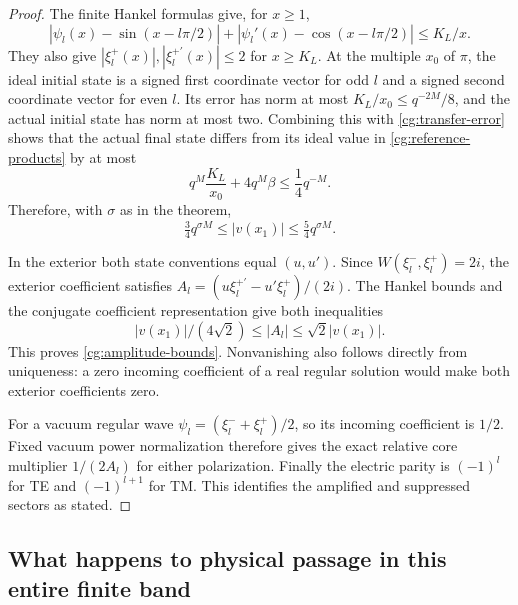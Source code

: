 \begin{proof}
The finite Hankel formulas give, for $x\geq1$,
\begin{equation}\label{cg:bessel-errors}
 |\psi_l(x)-\sin(x-l\pi/2)|
 +|\psi_l'(x)-\cos(x-l\pi/2)|\leq K_L/x.
\end{equation}
They also give $|\xi_l^+(x)|,|\xi_l^{+\prime}(x)|\leq2$
for $x\geq K_L$.  At the multiple $x_0$ of $\pi$, the ideal
initial state is a signed first coordinate vector for odd $l$ and
a signed second coordinate vector for even $l$.  Its error has norm
at most $K_L/x_0\leq q^{-2M}/8$, and the actual initial state
has norm at most two.  Combining this with
\eqref{cg:transfer-error} shows that the actual final state differs
from its ideal value in \eqref{cg:reference-products} by at most
\begin{equation}\label{cg:state-error}
 q^M\frac{K_L}{x_0}+4q^M\beta\leq\frac14q^{-M}.
\end{equation}
Therefore, with $\sigma$ as in the theorem,
\begin{equation}\label{cg:state-size}
 \tfrac34q^{\sigma M}\leq|v(x_1)|
       \leq\tfrac54q^{\sigma M}.
\end{equation}

In the exterior both state conventions equal $(u,u')$.  Since
$W(\xi_l^-,\xi_l^+)=2i$, the exterior coefficient satisfies
$A_l=(u\xi_l^{+\prime}-u'\xi_l^+)/(2i)$.
The Hankel bounds and the conjugate coefficient representation
give both inequalities
\begin{equation}\label{cg:coefficient-state}
 |v(x_1)|/(4\sqrt2)\leq|A_l|\leq\sqrt2|v(x_1)|.
\end{equation}
This proves \eqref{cg:amplitude-bounds}.  Nonvanishing also follows
directly from uniqueness: a zero incoming coefficient of a real
regular solution would make both exterior coefficients zero.

For a vacuum regular wave $\psi_l=(\xi_l^-+\xi_l^+)/2$, so its
incoming coefficient is $1/2$.  Fixed vacuum power normalization
therefore gives the exact relative core multiplier $1/(2A_l)$
for either polarization.  Finally the electric parity is $(-1)^l$
for TE and $(-1)^{l+1}$ for TM.  This identifies the amplified and
suppressed sectors as stated.
\end{proof}

\subsection{What happens to physical passage in this entire finite band}

